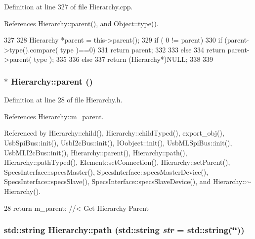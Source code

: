 Definition at line 327 of file Hierarchy.cpp.

References Hierarchy::parent(), and Object::type().


\begin{DoxyCode}
327                                             {
328   Hierarchy *parent = this->parent();
329   if ( 0 != parent){
330     if (parent->type().compare( type )==0) {
331       return parent;
332     }
333     else
334       return parent->parent( type );
335   }
336   else {
337     return (Hierarchy*)NULL;
338   }
339 }
\end{DoxyCode}
\hypertarget{classHierarchy_a1c7bec8257e717f9c1465e06ebf845fc}{
\subsubsection[{parent}]{$\ast$ Hierarchy::parent ()}}
\label{classHierarchy_a1c7bec8257e717f9c1465e06ebf845fc}


Definition at line 28 of file Hierarchy.h.

References Hierarchy::m\_\-parent.

Referenced by Hierarchy::child(), Hierarchy::childTyped(), export\_\-obj(), UsbSpiBus::init(), UsbI2cBus::init(), IOobject::init(), UsbMLSpiBus::init(), UsbMLI2cBus::init(), Hierarchy::parent(), Hierarchy::path(), Hierarchy::pathTyped(), Element::setConnection(), Hierarchy::setParent(), SpecsInterface::specsMaster(), SpecsInterface::specsMasterDevice(), SpecsInterface::specsSlave(), SpecsInterface::specsSlaveDevice(), and Hierarchy::$\sim$Hierarchy().


\begin{DoxyCode}
28 { return m_parent; }  //< Get Hierarchy Parent
\end{DoxyCode}
\hypertarget{classHierarchy_aa7990fa7caf132d83e361ce033c6c65a}{
\subsubsection[{path}]{\setlength{\rightskip}{0pt plus 5cm}std::string Hierarchy::path (std::string {\em str} = {\ttfamily std::string(\char`\"{}\char`\"{})})}}
\label{classHierarchy_aa7990fa7caf132d83e361ce033c6c65a}



